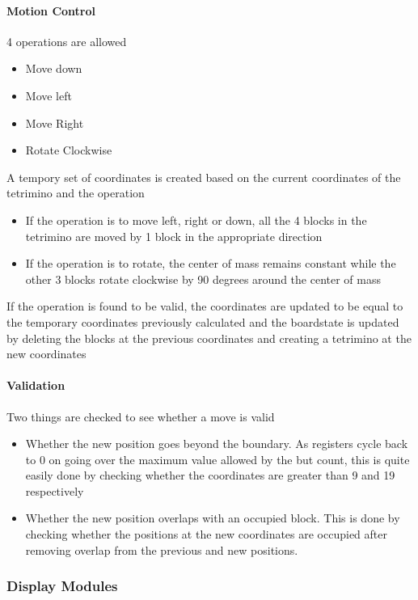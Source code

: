 \paragraph{Motion Control }
\label{paragraph:motioncontrol}
4 operations are allowed
\begin{itemize}
    \item Move down
    \item Move left
    \item Move Right
    \item Rotate Clockwise
\end{itemize}
 A tempory set of coordinates is created based on the current coordinates of the tetrimino and the operation 
 \begin{itemize}
     \item If the operation is to move left, right or down, all the 4 blocks in the tetrimino are moved by 1 block in the appropriate direction
     \item If the operation is to rotate, the center of mass remains constant while the other 3 blocks rotate clockwise by 90 degrees around the center of mass
 \end{itemize}
 If the operation is found to be valid, the coordinates are updated to
 be equal to the temporary coordinates previously calculated and the boardstate is updated by deleting the blocks at the previous coordinates
 and creating a tetrimino at the new coordinates

\paragraph{Validation }
\label{paragraph:validation}
Two things are checked to see whether a move is valid 
\begin{itemize}
    \item Whether the new position goes beyond the boundary.  As registers cycle back to 0 on going over the maximum 
    value allowed by the but count, this is quite easily done
    by checking  whether the coordinates are greater than 9 and 19 respectively
    \item Whether the new position overlaps with an occupied block. This is done by checking whether the positions at the new coordinates 
    are occupied after removing overlap from the previous and new positions. 
   
\end{itemize}

\subsubsection{Display Modules}
\label{subsection:display}

